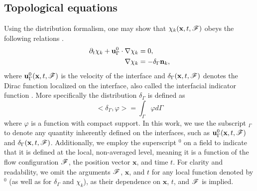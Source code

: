 
\subsection{Topological equations}
Using the distribution formalism, one may show that $\chi_k(\textbf{x},t,\mathscr{F})$ obeys the following relations \citep{drew1983mathematical}. 
\begin{align}
    \pddt \chi_k
    + \textbf{u}_\Gamma^0 \cdot \grad \chi_k
    &= 0,
    \label{eq:dt_chi_k}\\
    \label{eq:grad_chi_k}
    \grad \chi_k
    &= - \delta_\Gamma \textbf{n}_k, 
\end{align}
where $\textbf{u}^0_\Gamma(\textbf{x},t,\mathscr{F})$ is the velocity of the interface and $\delta_\Gamma(\textbf{x},t,\mathscr{F})$ denotes the Dirac function localized on the interface, also called the interfacial indicator function \citep{drew1983mathematical,junqua2003}. 
More specifically the distribution $\delta_\Gamma$ is defined as \citep{appel2007}
\begin{equation}
<\delta_\Gamma,\varphi> =\int_{\Gamma} \varphi d\Gamma 
\label{eq:def_surf_distribution}
\end{equation}  
where $\varphi$ is a function with compact support. %
In this work, we use the subscript $_\Gamma$ to denote any quantity inherently defined on the interfaces, such as $\textbf{u}_\Gamma^0(\textbf{x}, t, \mathscr{F})$ and $\delta_\Gamma(\textbf{x}, t, \mathscr{F})$. Additionally, we employ the superscript $^0$ on a field to indicate that it is defined at the local, non-averaged level, meaning it is a function of the flow configuration $\mathscr{F}$, the position vector $\textbf{x}$, and time $t$. For clarity and readability, we omit the arguments $\mathscr{F}$, $\textbf{x}$, and $t$ for any local function denoted by $^0$ (as well as for $\delta_\Gamma$ and $\chi_k$), as their dependence on $\textbf{x}$, $t$, and $\mathscr{F}$ is implied.

